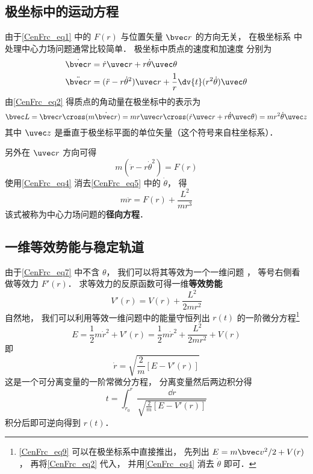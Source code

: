 \subsection{极坐标中的运动方程}
由于\autoref{CenFrc_eq1} 中的 $F(r)$ 与位置矢量 $\bvec r$ 的方向无关， 在极坐标系 中处理中心力场问题通常比较简单． 极坐标中质点的速度和加速度 分别为
\begin{align}
\dot{\bvec r} &= \dot r \uvec r + r\dot\theta\uvec\theta\label{CenFrc_eq2}\\
\ddot{\bvec r} &= (\ddot{r} - r \dot\theta^2)\uvec r + \frac 1r \dv{t} (r^2\dot\theta)\uvec \theta\label{CenFrc_eq3}
\end{align}
由\autoref{CenFrc_eq2} 得质点的角动量在极坐标中的表示为
\begin{equation}\label{CenFrc_eq4}
\bvec L = \bvec r \cross (m \dot{\bvec r})
= mr \uvec r \cross (\dot r \uvec r + r\dot\theta \uvec\theta)
= mr^2\dot \theta \uvec z
\end{equation}
其中 $\uvec z$ 是垂直于极坐标平面的单位矢量（这个符号来自柱坐标系）． 

另外在 $\uvec r$ 方向可得
\begin{equation}\label{CenFrc_eq5}
m(\ddot{r} - r \dot\theta^2) = F(r)
\end{equation}
使用\autoref{CenFrc_eq4} 消去\autoref{CenFrc_eq5} 中的 $\dot\theta$， 得
\begin{equation}\label{CenFrc_eq7}
m\ddot r = F(r) + \frac{L^2}{mr^3}
\end{equation}
该式被称为中心力场问题的\textbf{径向方程}．

\subsection{一维等效势能与稳定轨道}
由于\autoref{CenFrc_eq7} 中不含 $\theta$， 我们可以将其等效为一个一维问题%
， 等号右侧看做等效力 $F'(r)$． 求等效力的反原函数可得一维\textbf{等效势能}
\begin{equation}\label{CenFrc_eq6}
V'(r) = V(r) + \frac{L^2}{2mr^2}
\end{equation}
自然地， 我们可以利用等效一维问题中的能量守恒列出 $r(t)$ 的一阶微分方程\footnote{\autoref{CenFrc_eq9} 可以在极坐标系中直接推出， 先列出 $E = m\bvec v^2/2 + V(r)$， 再将\autoref{CenFrc_eq2} 代入， 并用\autoref{CenFrc_eq4} 消去 $\dot\theta$ 即可．}
\begin{equation}\label{CenFrc_eq9}
E = \frac 12 m\dot r^2 + V'(r) = \frac 12 m\dot r^2 + \frac{L^2}{2mr^2} + V(r)
\end{equation}
即
\begin{equation}
\dot r = \sqrt{\frac 2m [E - V'(r)]}
\end{equation}
这是一个可分离变量的一阶常微分方程， %
分离变量然后两边积分得
\begin{equation}
t = \int_{r_0}^{r} \frac{\dd{r}}{\sqrt{\frac 2m [E - V'(r)]}}
\end{equation}
积分后即可逆向得到 $r(t)$．

